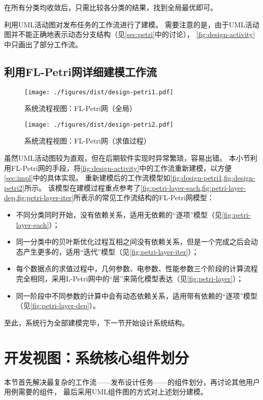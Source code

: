 \documentclass[index]{subfiles}
\begin{document}
在所有分类均收敛后，只需比较各分类的结果，找到全局最优即可。

利用UML活动图对发布任务的工作流进行了建模。
需要注意的是，由于UML活动图并不能正确地表示动态分支结构（见\cref{sec:petri}中的讨论），
\cref{fig:design-activity}中只画出了部分工作流。

\subsection{利用FL-Petri网详细建模工作流}
\begin{figure}[h]
  \centering
  \texttt{[image: ./figures/dist/design-petri1.pdf]}
  \caption{系统流程视图：FL-Petri网（全局）\label{fig:design-petri1}}
\end{figure}
\begin{figure}[h]
  \centering
  \texttt{[image: ./figures/dist/design-petri2.pdf]}
  \caption{系统流程视图：FL-Petri网（求值过程）\label{fig:design-petri2}}
\end{figure}
虽然UML活动图较为直观，但在后期软件实现时异常繁琐，容易出错。
本小节利用FL-Petri网的手段，将\cref{fig:design-activity}中的工作流重新建模，以方便\cref{sec:impl}中的具体实现。
重新建模后的工作流模型如\cref{fig:design-petri1,fig:design-petri2}所示。
该模型在建模过程重点参考了\cref{fig:petri-layer-each,fig:petri-layer-dep,fig:petri-layer-iter}所表示的常见工作流结构的FL-Petri网模型：
\begin{itemize}
  \item 不同分类同时开始，没有依赖关系，适用无依赖的“逐项”模型（见\cref{fig:petri-layer-each}）；
  \item 同一分类中的贝叶斯优化过程互相之间没有依赖关系，但是一个完成之后会动态产生更多的，适用“迭代”模型（见\cref{fig:petri-layer-iter}）；
  \item 每个数据点的求值过程中，几何参数、电参数、性能参数三个阶段的计算流程完全相同，采用L-Petri网中的“层”来简化模型表达（见\cref{fig:petri-layer}）；
  \item 同一阶段中不同参数的计算中会有动态依赖关系，适用带有依赖的“逐项”模型（见\cref{fig:petri-layer-dep}）。
\end{itemize}

至此，系统行为全部建模完毕，下一节开始设计系统结构。

\section{开发视图：系统核心组件划分}\label{sec:design-comp}
本节首先解决最复杂的工作流——发布设计任务——的组件划分，再讨论其他用户用例需要的组件，
最后采用UML组件图的方式对上述划分建模。
\end{document}
